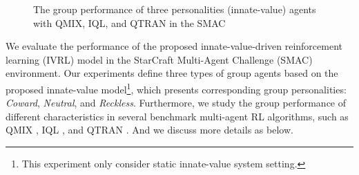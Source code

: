 \documentclass[letterpaper]{article} %
\begin{document}
\begin{figure}[hptb]
\centering
{}
\caption{The group performance of three personalities (innate-value) agents with QMIX, IQL, and QTRAN in the SMAC}
\label{results}
\end{figure}

We evaluate the performance of the proposed innate-value-driven reinforcement learning (IVRL) model in the StarCraft Multi-Agent Challenge (SMAC) \cite{samvelyan19smac} environment. Our experiments define three types of group agents based on the proposed innate-value model\footnote{This experiment only consider static innate-value system setting.}, which presents corresponding group personalities: \textit{Coward}, \textit{Neutral}, and \textit{Reckless}.
Furthermore, we study the group performance of different characteristics in several benchmark multi-agent RL algorithms, such as QMIX \cite{rashid2020monotonic}, IQL \cite{tampuu2017multiagent}, and QTRAN \cite{son2019qtran}. And we discuss more details as below.
\end{document}
